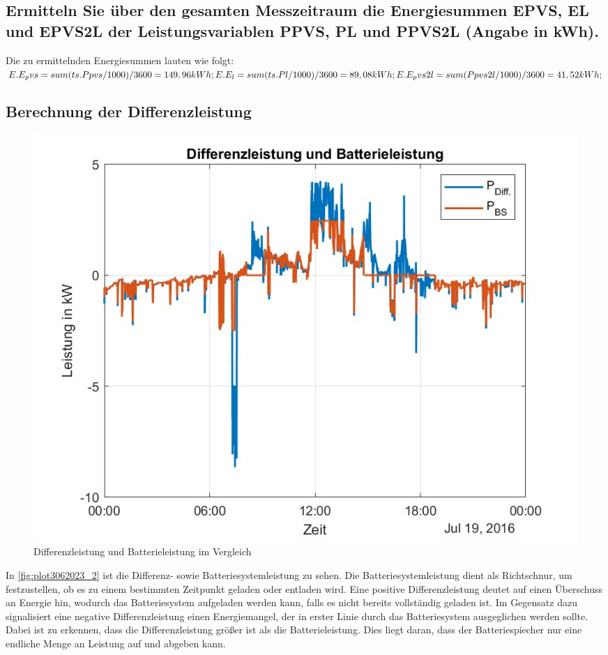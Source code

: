 \subsection{Ermitteln Sie über den gesamten Messzeitraum die Energiesummen EPVS, EL und EPVS2L der
Leistungsvariablen PPVS, PL und PPVS2L (Angabe in kWh).}
Die zu ermittelnden Energiesummen lauten wie folgt:
\\

$E.E_pvs = sum(ts.Ppvs/1000)/3600=149,96kWh;\\
E.E_l = sum(ts.Pl/1000)/3600=89,08kWh;\\
E.E_pvs2l = sum(Ppvs2l/1000)/3600=41,52kWh;$\\

\subsection{Berechnung der Differenzleistung}
\begin{figure}[H]
    \centering
    \includegraphics[width=\textwidth]{Abbildungen/plot_vorbereitungsfrage3.jpg}
    \caption{Differenzleistung und Batterieleistung im Vergleich}
    \label{fig:plot3062023_2}
\end{figure}
In \autoref{fig:plot3062023_2} ist die Differenz- sowie Batteriesystemleistung zu sehen. 
Die Batteriesystemleistung dient als Richtschnur, um festzustellen, ob es zu einem bestimmten Zeitpunkt geladen oder entladen wird. 
Eine positive Differenzleistung deutet auf einen Überschuss an Energie hin, wodurch das Batteriesystem aufgeladen werden kann, falls es nicht bereits vollständig geladen ist. Im Gegensatz dazu signalisiert eine negative Differenzleistung einen Energiemangel, der in erster Linie durch das Batteriesystem ausgeglichen werden sollte.
Dabei ist zu erkennen, dass die Differenzleistung größer ist als die Batterieleistung. 
Dies liegt daran, dass der Batteriespiecher nur eine endliche Menge an Leistung auf und abgeben kann.

